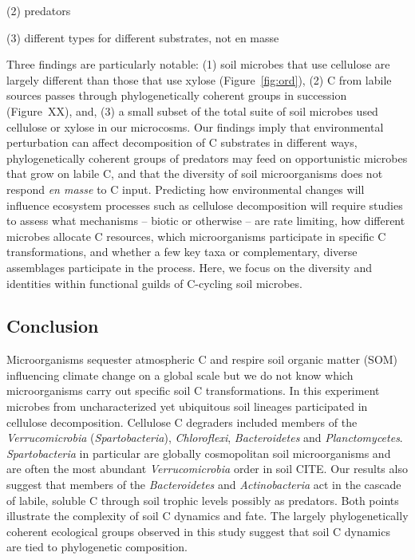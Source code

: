 (2) predators

(3) different types for different substrates, not en masse

Three findings are particularly notable: (1) soil microbes that use cellulose
are largely different than those that use xylose (Figure~\ref{fig:ord}), (2)
C from labile sources passes through phylogenetically coherent groups in
succession (Figure~XX), and, (3) a small subset of the total suite of soil
microbes used cellulose or xylose in our microcosms. Our findings imply that
environmental perturbation can affect decomposition of C substrates in
different ways, phylogenetically coherent groups of predators may feed on
opportunistic microbes that grow on labile C, and that the diversity of soil
microorganisms does not respond \textit{en masse} to C input. Predicting how
environmental changes will influence ecosystem processes such as cellulose
decomposition will require studies to assess what mechanisms -- biotic or
otherwise -- are rate limiting, how different microbes allocate C resources,
which microorganisms participate in specific C transformations, and whether
a few key taxa or complementary, diverse assemblages participate in the
process. Here, we focus on the diversity and identities within functional
guilds of C-cycling soil microbes.

\subsection{Conclusion} 
Microorganisms sequester atmospheric C and respire soil organic
matter (SOM) influencing climate change on a global scale but we do not
know which microorganisms carry out specific soil C transformations. In
this experiment microbes from uncharacterized yet ubiquitous soil lineages
participated in cellulose decomposition. Cellulose C degraders included
members of the \textit{Verrucomicrobia} (\textit{Spartobacteria}),
\textit{Chloroflexi}, \textit{Bacteroidetes} and \textit{Planctomycetes}.
\textit{Spartobacteria} in particular are globally cosmopolitan soil
microorganisms and are often the most abundant \textit{Verrucomicrobia}
order in soil CITE. Our results also suggest that members of the
\textit{Bacteroidetes} and \textit{Actinobacteria} act in the cascade of
labile, soluble C through soil trophic levels possibly as predators. Both
points illustrate the complexity of soil C dynamics and fate. The largely
phylogenetically coherent ecological groups observed in this study suggest that
soil C dynamics are tied to phylogenetic composition.
